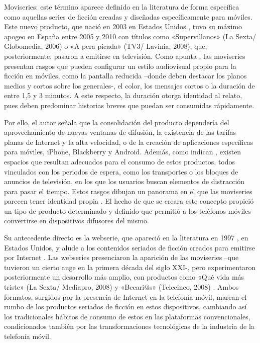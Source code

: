 \documentclass[spanish]{textolivre}
\begin{document}
Moviseries: este término aparece definido en la literatura de forma específica \cite{adelantadomateu2011, morante2011, saez2010} como aquellas series de ficción creadas y diseñadas específicamente para móviles. Este nuevo producto, que nació en 2003 en Estados Unidos \cite{dawson2012}, tuvo su máximo apogeo en España entre 2005 y 2010 con títulos como «Supervillanos» (La Sexta/ Globomedia, 2006) o «A pera picada» (TV3/ Lavinia, 2008), que, posteriormente, pasaron a emitirse en televisión. Como apunta \textcite{morante2011}, las moviseries presentan rasgos que pueden configurar un estilo audiovisual propio para la ficción en móviles, como la pantalla reducida –donde deben destacar los planos medios y cortos sobre los generales-, el color, los mensajes cortos o la duración de entre 1,5 y 3 minutos. A este respecto, la duración otorga identidad al relato, pues deben predominar historias breves que puedan ser consumidas rápidamente. 

Por ello, el autor señala que la consolidación del producto dependería del aprovechamiento de nuevas ventanas de difusión, la existencia de las tarifas planas de Internet y la alta velocidad, o de la creación de aplicaciones específicas para móviles, iPhone, Blackberry y Android. Además, como indican \textcite{mendiz-noguero2011}, existen espacios que resultan adecuados para el consumo de estos productos, todos vinculados con los periodos de espera, como los transportes o los bloques de anuncios de televisión, en los que los usuarios buscan elementos de distracción para pasar el tiempo. Estos rasgos dibujan un panorama en el que las moviseries parecen tener identidad propia \cite{prario2007}. El hecho de que se creara este concepto propició un tipo de producto determinado y definido que permitió a los teléfonos móviles convertirse en dispositivos difusores del mismo. 

Su antecedente directo es la webserie, que apareció en la literatura en 1997 \cite{saez2010}, en Estados Unidos, y alude a los contenidos seriados de ficción creados para emitirse por Internet \cite{monaghan2017, montoyabermudez2016, barron2013}. Las webseries presenciaron la aparición de las moviseries –que tuvieron un cierto auge en la primera década del siglo XXI-, pero experimentaron posteriormente un desarrollo más amplio, con productos como «Qué vida más triste» (La Sexta/ Mediapro, 2008) y «Becari@s» (Telecinco, 2008) \cite{saez2010}. Ambos formatos, surgidos por la presencia de Internet en la telefonía móvil, marcan el rumbo de los productos seriados de ficción en estos dispositivos, cambiando así los tradicionales hábitos de consumo de estos en las plataformas convencionales, condicionados también por las transformaciones tecnológicas de la industria de la telefonía móvil. 
\end{document}
